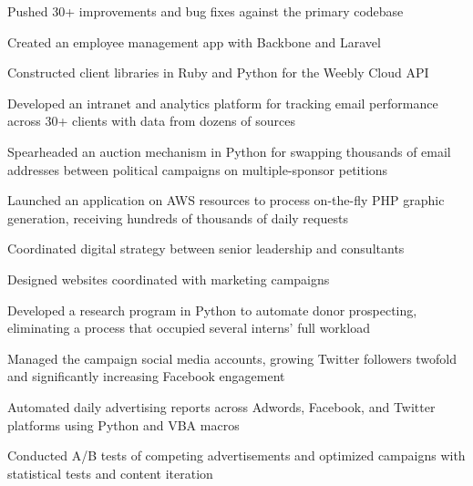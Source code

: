 \begin{listitems}
\item Pushed 30+ improvements and bug fixes against the primary codebase
\item Created an employee management app with Backbone and Laravel
\item Constructed client libraries in Ruby and Python for the Weebly Cloud API
\end{listitems}
\sectionsep

\begin{listitems}
\item Developed an intranet and analytics platform for tracking email performance across 30+ clients with data from dozens of sources
\item Spearheaded an auction mechanism in Python for swapping thousands of email addresses between political campaigns on multiple-sponsor petitions
\item Launched an application on AWS resources to process on-the-fly PHP graphic generation, receiving hundreds of thousands of daily requests
\end{listitems}
\sectionsep

\begin{listitems}
\item Coordinated digital strategy between senior leadership and consultants
\item Designed websites coordinated with marketing campaigns
\item Developed a research program in Python to automate donor prospecting, eliminating a process that occupied several interns' full workload
\item Managed the campaign social media accounts, growing Twitter followers twofold and significantly increasing Facebook engagement
\end{listitems}
\sectionsep

\begin{listitems}
\item Automated daily advertising reports across Adwords, Facebook, and Twitter platforms using Python and VBA macros
\item Conducted A/B tests of competing advertisements and optimized campaigns with statistical tests and content iteration
\end{listitems}
\sectionsep
